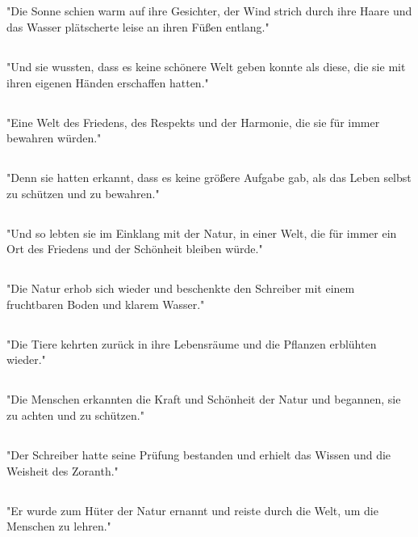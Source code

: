 \documentclass{article}
\begin{document}
\subsection{}
"Die Sonne schien warm auf ihre Gesichter, der Wind strich durch ihre Haare und das Wasser plätscherte leise an ihren Füßen entlang."
\subsection{}
"Und sie wussten, dass es keine schönere Welt geben konnte als diese, die sie mit ihren eigenen Händen erschaffen hatten."
\subsection{}
"Eine Welt des Friedens, des Respekts und der Harmonie, die sie für immer bewahren würden."
\subsection{}
"Denn sie hatten erkannt, dass es keine größere Aufgabe gab, als das Leben selbst zu schützen und zu bewahren."
\subsection{}
"Und so lebten sie im Einklang mit der Natur, in einer Welt, die für immer ein Ort des Friedens und der Schönheit bleiben würde."
\subsection{}
"Die Natur erhob sich wieder und beschenkte den Schreiber mit einem fruchtbaren Boden und klarem Wasser."
\subsection{}
"Die Tiere kehrten zurück in ihre Lebensräume und die Pflanzen erblühten wieder."
\subsection{}
"Die Menschen erkannten die Kraft und Schönheit der Natur und begannen, sie zu achten und zu schützen."
\subsection{}
"Der Schreiber hatte seine Prüfung bestanden und erhielt das Wissen und die Weisheit des Zoranth."
\subsection{}
"Er wurde zum Hüter der Natur ernannt und reiste durch die Welt, um die Menschen zu lehren."
\end{document}
